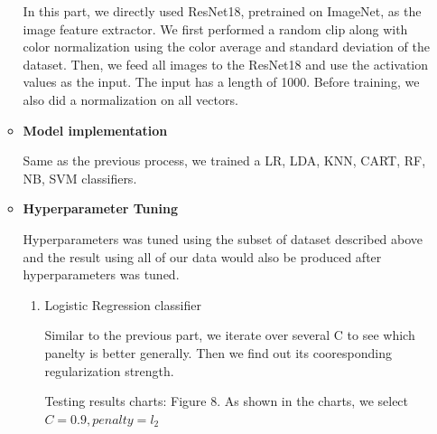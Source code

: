 \documentclass[11.5pt]{article}
\begin{document}
\begin{enumerate}
\begin{itemize}
            In this part, we directly used ResNet18, pretrained on ImageNet, as the image feature extractor. We first performed a random clip along with color normalization using the color average and standard deviation of the dataset. Then, we feed all images to the ResNet18 and use the activation values as the input. The input has a length of 1000. Before training, we also did a normalization on all vectors.
            \item \textbf{Model implementation}

            Same as the previous process, we trained a LR, LDA, KNN, CART, RF, NB, SVM classifiers.
            \item \textbf{Hyperparameter Tuning}

            Hyperparameters was tuned using the subset of dataset described above and the result using all of our data would also be produced after hyperparameters was tuned.
            \begin{enumerate}
                \item Logistic Regression classifier

                Similar to the previous part, we iterate over several C to see which panelty is better generally. Then we find out its cooresponding regularization strength.

                Testing results charts: Figure 8. As shown in the charts, we select $C = 0.9, penalty = l_2$


\end{enumerate}
\end{itemize}
\end{enumerate}
\end{document}
